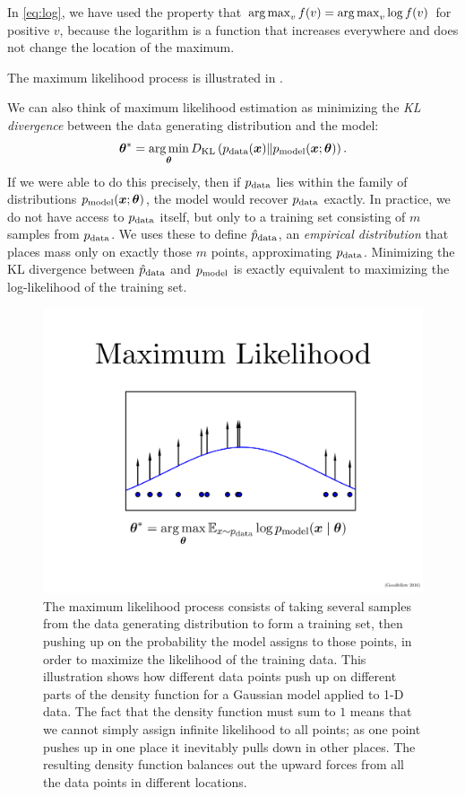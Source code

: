In \eqref{eq:log}, we have used the property that $\operatorname*{arg\,max}_v f(v) = \operatorname*{arg\,max}_v \log f(v)$ for 
positive $v$, because the logarithm is a function that increases everywhere and does not change
the location of the maximum.

The maximum likelihood process is illustrated in .

We can also think of maximum likelihood estimation as minimizing the
{\em KL divergence} between the data generating distribution and the
model:
\[ {\bm{\theta}}^* = \operatorname*{arg\,min}_{\bm{\theta}} D_{\mathrm{KL}}\left( p_{\rm{data}}({\bm{x}}) \Vert p_{\rm{model}}({\bm{x}} ; {\bm{\theta}}) \right). \]
If we were able to do this precisely, then if $p_{\rm{data}}$ lies within the family of distributions
$p_{\rm{model}}({\bm{x}} ; {\bm{\theta}})$, the model would recover $p_{\rm{data}}$ exactly.
In practice, we do not have access to $p_{\rm{data}}$ itself, but only to a training set
consisting of $m$ samples from $p_{\rm{data}}$.
We uses these to define $\hat{p}_{\rm{data}}$, an {\em empirical distribution} that places mass only
on exactly those $m$ points, approximating $p_{\rm{data}}$.
Minimizing the KL divergence between $\hat{p}_{\rm{data}}$ and $p_{\rm{model}}$ is exactly equivalent to maximizing
the log-likelihood of the training set.

\begin{figure}
\centering
\includegraphics[width=\textwidth]{mle.pdf}
\caption{The maximum likelihood process consists of taking several samples from
  the data generating distribution to form a training set, then pushing up on the
  probability the model assigns to those points, in order to maximize the likelihood
  of the training data.
  This illustration shows how different data points push up on different parts of
  the density function for a Gaussian model applied to 1-D data.
  The fact that the density function must sum to $1$ means that we cannot simply
  assign infinite likelihood to all points; as one point pushes up in one place
  it inevitably pulls down in other places.
  The resulting density function balances out the upward forces from all the data
  points in different locations.
}
\label{fig:mle}
\end{figure}

